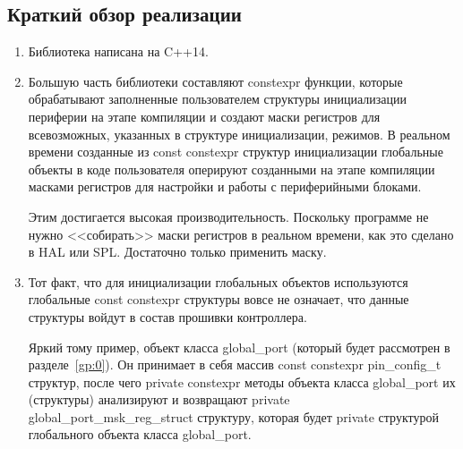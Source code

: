 \subsection{Краткий обзор реализации}
\begin{enumerate}
	\item Библиотека написана на C++14. 
	\item Большую часть библиотеки составляют constexpr функции, которые обрабатывают заполненные пользователем структуры инициализации периферии на этапе компиляции и создают маски регистров для всевозможных, указанных в структуре инициализации, режимов. В реальном времени созданные из const constexpr структур инициализации глобальные объекты в коде пользователя оперируют созданными на этапе компиляции масками регистров для настройки и работы с периферийными блоками.
	
	Этим достигается высокая производительность. Поскольку программе не нужно <<собирать>> маски регистров в реальном времени, как это сделано в HAL или SPL. Достаточно только применить маску.
	\item Тот факт, что для инициализации глобальных объектов используются глобальные const constexpr структуры вовсе не означает, что данные структуры войдут в состав прошивки контроллера.
	
	Яркий тому пример, объект класса global\_\-port (который будет рассмотрен в разделе~\ref{gp:0}). Он принимает в себя массив const constexpr pin\_config\_t структур, после чего private constexpr методы объекта класса global\_\-port их (структуры) анализируют и возвращают private global\_\-port\_\-msk\_\-reg\_\-struct структуру, которая будет private структурой глобального объекта класса global\_\-port.
	

\end{enumerate}
